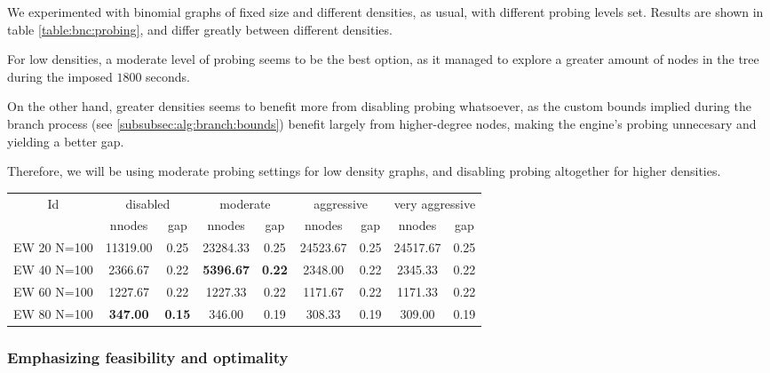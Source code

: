 We experimented with binomial graphs of fixed size and different densities, as usual, with different probing levels set. Results are shown in table \ref{table:bnc:probing}, and differ greatly between different densities.

For low densities, a moderate level of probing seems to be the best option, as it managed to explore a greater amount of nodes in the tree during the imposed $1800$ seconds. 

On the other hand, greater densities seems to benefit more from disabling probing whatsoever, as the custom bounds implied during the branch process (see \ref{subsubsec:alg:branch:bounds}) benefit largely from higher-degree nodes, making the engine's probing unnecesary and yielding a better gap.

Therefore, we will be using moderate probing settings for low density graphs, and disabling probing altogether for higher densities.

\begin{sidewaystable}[h]
\centering

\begin{tabular}{|c|cc|cc|cc|cc|}
\hline
\multicolumn{1}{|c|}{Id} & \multicolumn{2}{|c|}{disabled} & \multicolumn{2}{|c|}{moderate} & \multicolumn{2}{|c|}{aggressive} & \multicolumn{2}{|c|}{very aggressive}
\\
 & nnodes & gap & nnodes & gap & nnodes & gap & nnodes & gap
\\
\hline
EW 20 N=100 & 11319.00 & 0.25 & 23284.33 & 0.25 & 24523.67 & 0.25 & 24517.67 & 0.25
\\
EW 40 N=100 & 2366.67 & 0.22 & \textbf{5396.67} & \textbf{0.22} & 2348.00 & 0.22 & 2345.33 & 0.22
\\
EW 60 N=100 & 1227.67 & 0.22 & 1227.33 & 0.22 & 1171.67 & 0.22 & 1171.33 & 0.22
\\
EW 80 N=100 & \textbf{347.00} & \textbf{0.15} & 346.00 & 0.19 & 308.33 & 0.19 & 309.00 & 0.19
\\
\hline 
 \end{tabular}
 
\caption{Average number of nodes in the tree and resulting gap, for different MIP probing levels.}
\label{table:bnc:probing}

\end{sidewaystable}

\subsubsection{Emphasizing feasibility and optimality}

